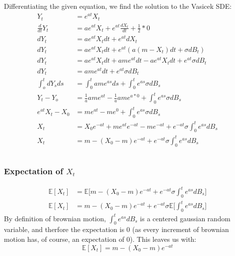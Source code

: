 \documentclass[a4paper,12pt]{article}
\begin{document}
\subsection{}
Differentiating the given equation, we find the solution to the Vasicek SDE:
\begin{align*}
Y_t &= e^{at}X_t \\
\frac{d}{dt}Y_t &= ae^{at}X_t + e^{at}\frac{dX_t}{dt} + \frac{1}{2}*0 \\
dY_t &= ae^{at}X_tdt + e^{at}dX_t \\
dY_t &= ae^{at}X_tdt + e^{at}( a(m - X_t)dt + \sigma dB_t) \\
dY_t &= ae^{at}X_tdt + ame^{at}dt - ae^{at}X_tdt + e^{at} \sigma dB_t \\
dY_t &= ame^{at}dt + e^{at} \sigma dB_t \\
\int_o^t dY_sds &= \int_0^t ame^{as}ds + \int_0^t e^{as} \sigma dB_s \\
Y_t - Y_o &= \frac{1}{a} ame^{at} - \frac{1}{a}ame^{a*0} + \int_0^t e^{as} \sigma dB_s \\
e^{at}X_t - X_0 &= me^{at} - me^{0} + \int_0^t e^{as} \sigma dB_s \\
X_t &= X_0e^{-at} + me^{at}e^{-at} - me^{-at} + e^{-at}\sigma \int_0^t e^{as} dB_s \\
X_t &= m - (X_0 - m)e^{-at} + e^{-at}\sigma \int_0^t e^{as} dB_s \\
\end{align*}

\subsection{}

\subsubsection*{Expectation of $X_t$}
\begin{align*}
\mathbb{E}[X_t] &= \mathbb{E} \bigg[ m - (X_0 - m)e^{-at} + e^{-at}\sigma \int_0^t e^{as} dB_s \bigg] \\
\mathbb{E}[X_t] &= m - (X_0 - m) e^{-at} + e^{-at}\sigma \mathbb{E} \bigg[ \int_0^t   e^{as} dB_s \bigg]
\end{align*}
%
By definition of brownian motion, $\int_0^t   e^{as} dB_s$ is a centered gaussian random variable, and therfore the expectation is 0 (as every increment of brownian motion has, of course, an expectation of 0). This leaves us with:
$$
\mathbb{E}[X_t] = m - (X_0 - m) e^{-at}
$$
%
\end{document}
